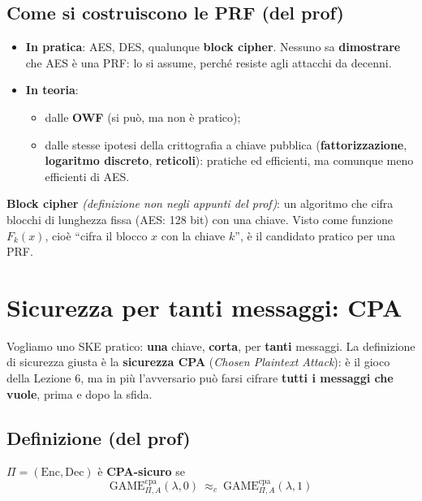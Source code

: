 \subsection{Come si costruiscono le PRF (del prof)}

\begin{itemize}
  \item \textbf{In pratica}: AES, DES, qualunque \textbf{block cipher}. Nessuno sa \textbf{dimostrare} che AES è una PRF: lo si assume, perché resiste agli attacchi da decenni.
  \item \textbf{In teoria}:
  \begin{itemize}
    \item dalle \textbf{OWF} (si può, ma non è pratico);
    \item dalle stesse ipotesi della crittografia a chiave pubblica (\textbf{fattorizzazione}, \textbf{logaritmo discreto}, \textbf{reticoli}): pratiche ed efficienti, ma comunque meno efficienti di AES.
  \end{itemize}
\end{itemize}

\begin{nota}
\textbf{Block cipher} \emph{(definizione non negli appunti del prof)}: un algoritmo che cifra blocchi di lunghezza fissa (AES: 128 bit) con una chiave. Visto come funzione \(F_k(x)\), cioè ``cifra il blocco \(x\) con la chiave \(k\)'', è il candidato pratico per una PRF.
\end{nota}

\section{Sicurezza per tanti messaggi: CPA}

\begin{inbreve}
Vogliamo uno SKE pratico: \textbf{una} chiave, \textbf{corta}, per \textbf{tanti} messaggi. La definizione di sicurezza giusta è la \textbf{sicurezza CPA} (\emph{Chosen Plaintext Attack}): è il gioco della Lezione 6, ma in più l'avversario può farsi cifrare \textbf{tutti i messaggi che vuole}, prima e dopo la sfida.
\end{inbreve}

\subsection{Definizione (del prof)}

\(\Pi = (\text{Enc}, \text{Dec})\) è \textbf{CPA-sicuro} se
\[
\text{GAME}^{\text{cpa}}_{\Pi, A}(\lambda, 0) \ \approx_c\ \text{GAME}^{\text{cpa}}_{\Pi, A}(\lambda, 1)
\]


